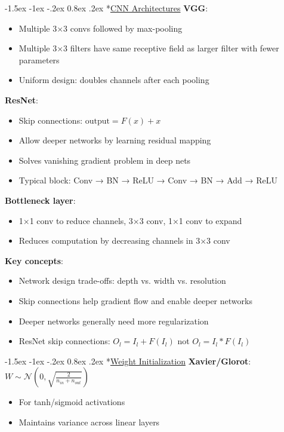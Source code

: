 \documentclass{article}
\makeatletter
\renewcommand\section{\@startsection{section}{1}{\z@}%
                                  {-1.5ex \@plus -1ex \@minus -.2ex}%
                                  {0.8ex \@plus.2ex}%
                                  {\normalfont\small\bfseries}}
\makeatother
\begin{document}
\begin{multicols}{3}
\section*{\underline{CNN Architectures}}
\textbf{VGG}:
\begin{itemize}
\item Multiple 3×3 convs followed by max-pooling
\item Multiple 3×3 filters have same receptive field as larger filter with fewer parameters
\item Uniform design: doubles channels after each pooling
\end{itemize}

\textbf{ResNet}:
\begin{itemize}
\item Skip connections: $\text{output} = F(x) + x$
\item Allow deeper networks by learning residual mapping
\item Solves vanishing gradient problem in deep nets
\item Typical block: Conv → BN → ReLU → Conv → BN → Add → ReLU
\end{itemize}

\textbf{Bottleneck layer}:
\begin{itemize}
\item 1×1 conv to reduce channels, 3×3 conv, 1×1 conv to expand
\item Reduces computation by decreasing channels in 3×3 conv
\end{itemize}

\textbf{Key concepts}:
\begin{itemize}
\item Network design trade-offs: depth vs. width vs. resolution
\item Skip connections help gradient flow and enable deeper networks
\item Deeper networks generally need more regularization
\item ResNet skip connections: $O_l = I_l + F(I_l)$ not $O_l = I_l * F(I_l)$
\end{itemize}

\section*{\underline{Weight Initialization}}
\textbf{Xavier/Glorot}: $W \sim \mathcal{N}(0, \sqrt{\frac{2}{n_{in} + n_{out}}})$
\begin{itemize}
\item For tanh/sigmoid activations
\item Maintains variance across linear layers
\end{itemize}


\end{multicols}
\end{document}
